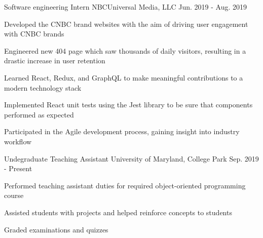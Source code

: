 \begin{cventries}
  \cventry
    {Software engineering Intern} %
    {NBCUniversal Media, LLC} %
    {} %
    {Jun. 2019 - Aug. 2019} %
    {
      \begin{cvitems} %
        \item {Developed the CNBC brand websites with the aim of driving user engagement with CNBC brands}
        \item {Engineered new 404 page which saw thousands of daily visitors, resulting in a drastic increase in user retention}
        \item {Learned React, Redux, and GraphQL to make meaningful contributions to a modern technology stack}
        \item {Implemented React unit tests using the Jest library to be sure that components performed as expected}
        \item {Participated in the Agile development process, gaining insight into industry workflow}
        \end{cvitems}
    }

\cventry
    {Undegraduate Teaching Assistant} %
    {University of Maryland, College Park} %
    {} %
    {Sep. 2019 - Present} %
    {
      \begin{cvitems} %
        \item {Performed teaching assistant duties for required object-oriented programming course}
        \item {Assisted students with projects and helped reinforce concepts to students}
        \item {Graded examinations and quizzes}
        \end{cvitems}
    }


\end{cventries}
